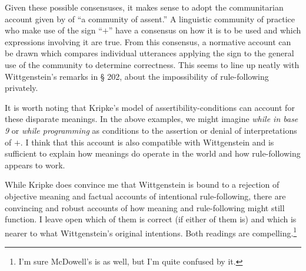 \documentclass[doc,12pt,apacite,biblatex]{apa6}
\begin{document}
Given these possible consensuses, it makes sense to adopt the communitarian
account given by  of ``a community of assent.'' A linguistic
community of practice who make use of the sign ``$+$'' have a consensus on how
it is to be used and which expressions involving it are true. From this
consensus, a normative account can be drawn which compares individual
utterances applying the sign to the general use of the community to determine
correctness. This seems to line up neatly with Wittgenstein's remarks in \S
202, about the impossibility of rule-following privately.

It is worth noting that Kripke's model of assertibility-conditions can account
for these disparate meanings. In the above examples, we might imagine
\emph{while in base 9} or \emph{while programming} as conditions to the
assertion or denial of interpretations of $+$. I think that this account is
also compatible with Wittgenstein and is sufficient to explain how meanings do
operate in the world and how rule-following appears to work. 

While Kripke does convince me that Wittgenstein is bound to a rejection of
objective meaning and factual accounts of intentional rule-following, there are
convincing and robust accounts of how meaning and rule-following might still
function. I leave open which of them is correct (if either of them is) and
which is nearer to what Wittgenstein's original intentions. Both readings are
compelling.\footnote{I'm sure McDowell's is as well, but I'm quite confused by
it.}

\clearpage


\end{document}
